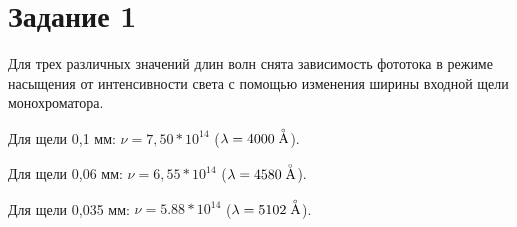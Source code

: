 \section{Задание 1}
Для трех различных значений длин волн снята зависимость фототока в режиме насыщения от интенсивности света с помощью изменения ширины входной щели монохроматора. 

Для щели 0,1 мм: $\nu=7,50*10^{14}$ ($\lambda=4000\buildrel _{\circ} \over {\mathrm{A}}$).

Для щели 0,06 мм: $\nu=6,55*10^{14}$ ($\lambda=4580\buildrel _{\circ} \over {\mathrm{A}}$).

Для щели 0,035 мм: $\nu=5.88*10^{14}$ ($\lambda=5102\buildrel _{\circ} \over {\mathrm{A}}$).

